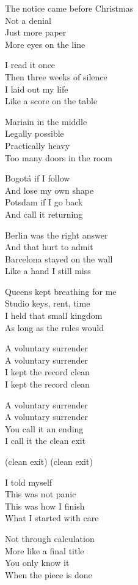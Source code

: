 \begin{lyrics}
The notice came before Christmas\\
Not a denial\\
Just more paper\\
More eyes on the line

I read it once\\
Then three weeks of silence\\
I laid out my life\\
Like a score on the table

Mariain in the middle\\
Legally possible\\
Practically heavy\\
Too many doors in the room

Bogotá if I follow\\
And lose my own shape\\
Potsdam if I go back\\
And call it returning

Berlin was the right answer\\
And that hurt to admit\\
Barcelona stayed on the wall\\
Like a hand I still miss

Queens kept breathing for me\\
Studio keys, rent, time\\
I held that small kingdom\\
As long as the rules would

A voluntary surrender\\
A voluntary surrender\\
I kept the record clean\\
I kept the record clean

A voluntary surrender\\
A voluntary surrender\\
You call it an ending\\
I call it the clean exit

(clean exit)
(clean exit)

I told myself\\
This was not panic\\
This was how I finish\\
What I started with care

Not through calculation\\
More like a final title\\
You only know it\\
When the piece is done


\end{lyrics}
